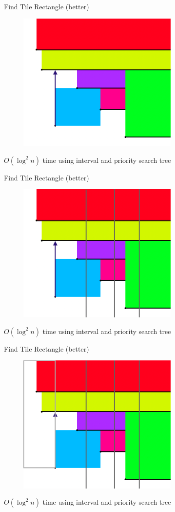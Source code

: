 \documentclass[11pt, british]{beamer}
\begin{document}
\begin{frame}{Find Tile Rectangle (better)}
  \begin{figure}
    \centering
    \includegraphics[width=8cm]{ray 1.png}
  \end{figure}

  $O(\log^2 n)$ time using interval and priority search tree 
\end{frame}

\begin{frame}{Find Tile Rectangle (better)}
  \begin{figure}
    \centering
    \includegraphics[width=8cm]{ray 3.png}
  \end{figure}

  $O(\log^2 n)$ time using interval and priority search tree 
\end{frame}

\begin{frame}{Find Tile Rectangle (better)}
  \begin{figure}
    \centering
    \includegraphics[width=8cm]{ray 4.png}
  \end{figure}

  $O(\log^2 n)$ time using interval and priority search tree 
\end{frame}
\end{document}
